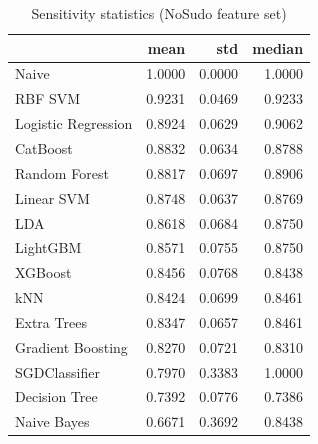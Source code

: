 \begin{table}
\caption{Sensitivity statistics (NoSudo feature set)}
\label{tab:sensitivity_NoSudo_stats}
\begin{tabular}{lrrr}
\toprule
 & mean & std & median \\
\midrule
Naive & 1.0000 & 0.0000 & 1.0000 \\
RBF SVM & 0.9231 & 0.0469 & 0.9233 \\
Logistic Regression & 0.8924 & 0.0629 & 0.9062 \\
CatBoost & 0.8832 & 0.0634 & 0.8788 \\
Random Forest & 0.8817 & 0.0697 & 0.8906 \\
Linear SVM & 0.8748 & 0.0637 & 0.8769 \\
LDA & 0.8618 & 0.0684 & 0.8750 \\
LightGBM & 0.8571 & 0.0755 & 0.8750 \\
XGBoost & 0.8456 & 0.0768 & 0.8438 \\
kNN & 0.8424 & 0.0699 & 0.8461 \\
Extra Trees & 0.8347 & 0.0657 & 0.8461 \\
Gradient Boosting & 0.8270 & 0.0721 & 0.8310 \\
SGDClassifier & 0.7970 & 0.3383 & 1.0000 \\
Decision Tree & 0.7392 & 0.0776 & 0.7386 \\
Naive Bayes & 0.6671 & 0.3692 & 0.8438 \\
\bottomrule
\end{tabular}
\end{table}
